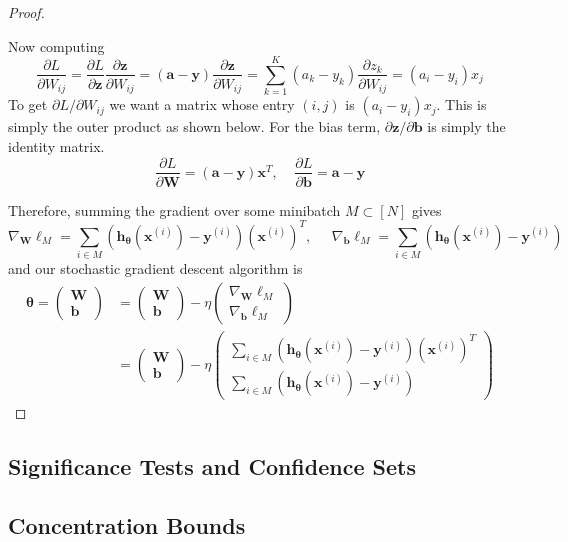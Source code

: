 \begin{proof}
\begin{center}
    \end{center}
    Now computing 
    \begin{equation}
      \frac{\partial L}{\partial W_{ij}} = \frac{\partial L}{\partial \mathbf{z}} \frac{\partial \mathbf{z}}{\partial W_{ij}} = (\mathbf{a} - \mathbf{y}) \frac{\partial \mathbf{z}}{\partial W_{ij}} = \sum_{k=1}^K (a_k - y_k) \frac{\partial z_k}{\partial W_{ij}} = (a_i - y_i) x_j
    \end{equation}
    To get $\partial L / \partial W_{ij}$ we want a matrix whose entry $(i, j)$ is $(a_i - y_i) x_j$. This is simply the outer product as shown below. For the bias term, $\partial \mathbf{z} / \partial \mathbf{b}$ is simply the identity matrix. 
    \begin{equation}
      \frac{\partial L}{\partial \mathbf{W}} = (\mathbf{a} - \mathbf{y}) \mathbf{x}^T, \;\;\;\; \frac{\partial L}{\partial \mathbf{b}} = \mathbf{a} - \mathbf{y}
    \end{equation}

    Therefore, summing the gradient over some minibatch $M \subset [N]$ gives 
    \begin{equation}
      \nabla_{\mathbf{W}} \ell_M = \sum_{i \in M} (\mathbf{h}_{\boldsymbol{\theta}}(\mathbf{x}^{(i)}) - \mathbf{y}^{(i)}) (\mathbf{x}^{(i)})^T, \;\;\;\;\; \nabla_{\mathbf{b}} \ell_M = \sum_{i \in M} (\mathbf{h}_{\boldsymbol{\theta}}(\mathbf{x}^{(i)}) - \mathbf{y}^{(i)})
    \end{equation}
    and our stochastic gradient descent algorithm is 
    \begin{align*}
      \boldsymbol{\theta} = \begin{pmatrix} \mathbf{W} \\ \mathbf{b} \end{pmatrix} & = \begin{pmatrix} \mathbf{W} \\ \mathbf{b} \end{pmatrix} - \eta \begin{pmatrix} \nabla_{\mathbf{W}} \ell_M \\ \nabla_{\mathbf{b}} \ell_M \end{pmatrix} \\
      & = \begin{pmatrix} \mathbf{W} \\ \mathbf{b} \end{pmatrix} - \eta \begin{pmatrix} \sum_{i \in M} (\mathbf{h}_{\boldsymbol{\theta}}(\mathbf{x}^{(i)}) - \mathbf{y}^{(i)}) (\mathbf{x}^{(i)})^T \\ \sum_{i \in M} (\mathbf{h}_{\boldsymbol{\theta}}(\mathbf{x}^{(i)}) - \mathbf{y}^{(i)}) \end{pmatrix} 
    \end{align*}
  \end{proof}

\subsection{Significance Tests and Confidence Sets}

\subsection{Concentration Bounds}

